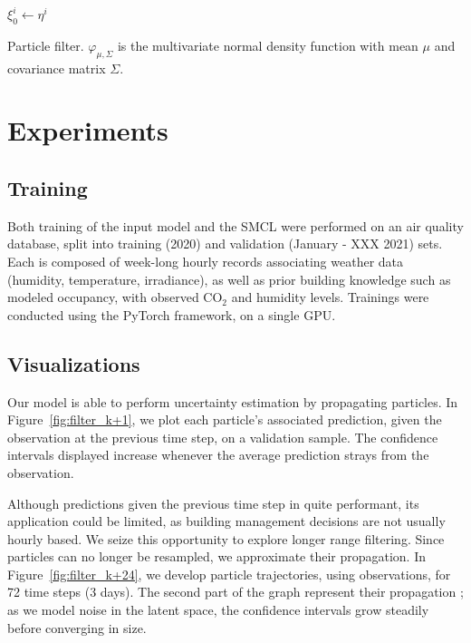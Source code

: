 \documentclass{article}
\begin{document}
\begin{algorithm}
	$\xi_0^i \gets \eta^i$\;
	\caption{Particle filter. $\varphi_{\mu, \Sigma}$ is the multivariate normal density function with mean $\mu$ and covariance matrix $\Sigma$.}
	\label{algo:particle_filter}
\end{algorithm}

\section{Experiments}
\label{sec:exp}

\subsection{Training}%
\label{sub:training}
Both training of the input model and the SMCL were performed on an air quality database, split into training (2020) and validation (January - XXX 2021) sets.
Each is composed of week-long hourly records associating weather data (humidity, temperature, irradiance), as well as prior building knowledge such as modeled occupancy, with observed \ensuremath{\mathrm{CO_2}} and humidity levels.
Trainings were conducted using the PyTorch framework, on a single GPU.

\subsection{Visualizations}%
\label{sub:visualizations}
Our model is able to perform uncertainty estimation by propagating particles.
In Figure~\ref{fig:filter_k+1}, we plot each particle's associated prediction, given the observation at the previous time step, on a validation sample.
The confidence intervals displayed increase whenever the average prediction strays from the observation.

Although predictions given the previous time step in quite performant, its application could be limited, as building management decisions are not usually hourly based.
We seize this opportunity to explore longer range filtering.
Since particles can no longer be resampled, we approximate their propagation.
In Figure~\ref{fig:filter_k+24}, we develop particle trajectories, using observations, for 72 time steps (3 days).
The second part of the graph represent their propagation ; as we model noise in the latent space, the confidence intervals grow steadily before converging in size.
\end{document}
